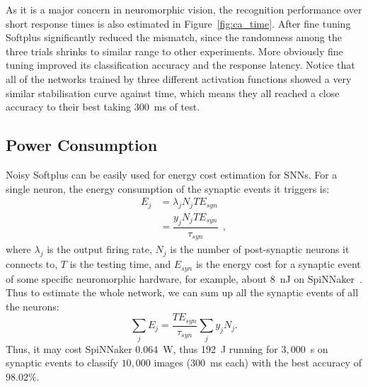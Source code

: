 	As it is a major concern in neuromorphic vision, the recognition performance over short response times is also estimated in Figure~\ref{fig:ca_time}.
	After fine tuning Softplus significantly reduced the mismatch, since the randomness among the three trials shrinks to similar range to other experiments.
	More obviously fine tuning improved its classification accuracy and the response latency.
	Notice that all of the networks trained by three different activation functions showed a very similar stabilisation curve against time, which means they all reached a close accuracy to their best taking 300~ms of test. 
	
	
	\subsection{Power Consumption}
	Noisy Softplus can be easily used for energy cost estimation for SNNs.
	For a single neuron, the energy consumption of the synaptic events it triggers is:
	\begin{equation}
	\begin{aligned}
	E_{j} &= \lambda_j N_j T E_{syn}\\
	&= \dfrac{y_j N_j T E_{syn}}{\tau_{syn}}~~,
	\end{aligned}
	\end{equation}
	where $\lambda_j$ is the output firing rate, $N_j$ is the number of post-synaptic neurons it connects to, $T$ is the testing time, and $E_{syn}$ is the energy cost for a synaptic event of some specific neuromorphic hardware, for example, about 8~nJ on SpiNNaker~\cite{stromatias2013power}.
	Thus to estimate the whole network, we can sum up all the synaptic events of all the neurons:
	\begin{equation}
	\sum_j E_{j} =  \dfrac{T E_{syn}}{\tau_{syn}} \sum_{j}y_j N_j.
	\end{equation}
	Thus, it may cost SpiNNaker 0.064~W, thus 192~J running for $3,000$~s on synaptic events to classify $10,000$ images (300~ms each) with the best accuracy of 98.02\%.
	
